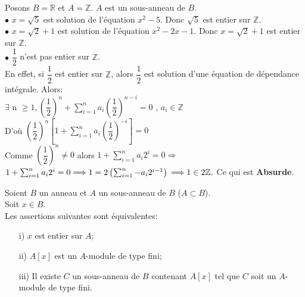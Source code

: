 \begin{monexemple}
	Posons $B = \mathbb{R}$ et $A = \mathbb{Z}$. $A$ est un sous-anneau de $B$.\\
	$\bullet$ $x = \sqrt{5}$ est solution de l'équation $x^2 - 5$. Donc $\sqrt{5}$ est entier sur $\mathbb{Z}$.\\
	$\bullet$ $x = \sqrt{2}+1$ est solution de l'équation $x^2 - 2x -1$. Donc $x = \sqrt{2}+1$ est entier sur $\mathbb{Z}$.\\
	$\bullet$ $\dfrac{1}{2}$ n'est pas entier sur $\mathbb{Z}$.\\
	En effet, si $\dfrac{1}{2}$ est entier sur $\mathbb{Z}$, alors $\dfrac{1}{2}$ est solution d'une équation de dépendance intégrale. Alors: \\
	$\exists$ n $\geq 1 , \left(\dfrac{1}{2} \right)^n + \sum_{i=1}^{n} a_i \left(\dfrac{1}{2} \right)^{n-i} = 0$ , $a_i \in\mathbb{Z}$\\
	D'où $\left(\dfrac{1}{2} \right)^n \left[1+\sum_{i=1}^{n} a_i \left(\dfrac{1}{2} \right)^{-i}\right] = 0$\\
	Comme $\left(\dfrac{1}{2} \right)^n \neq 0$ alors $1+\sum_{i=1}^{n} a_i2^{i} = 0\Longrightarrow$ $1+\sum_{i=1}^{n} a_i2^{i} = 0 \Longrightarrow 1 = 2\left(\sum_{i=1}^{n} -a_i 2^{i-1}\right)\\ \Longrightarrow 1\in 2\mathbb{Z}.$ Ce qui est \textbf{Absurde}. 
\end{monexemple}
\begin{maproposition}
	Soient $B$ un anneau et $A$ un sous-anneau de $B$ ($A \subset B$).\\
	Soit $x \in B$. \\
	Les assertions suivantes sont équivalentes:
	\begin{enumerate}
		\item[i)]$x$ est entier sur $A$;
		\item[ii)]$A\left[ x\right]$ est un $A$-module de type fini;
		\item[iii)]Il existe $C$ un sous-anneau de $B$ contenant $A\left[ x\right]$ tel que $C$ soit un $A$-module de type fini.
	\end{enumerate}
\end{maproposition}

